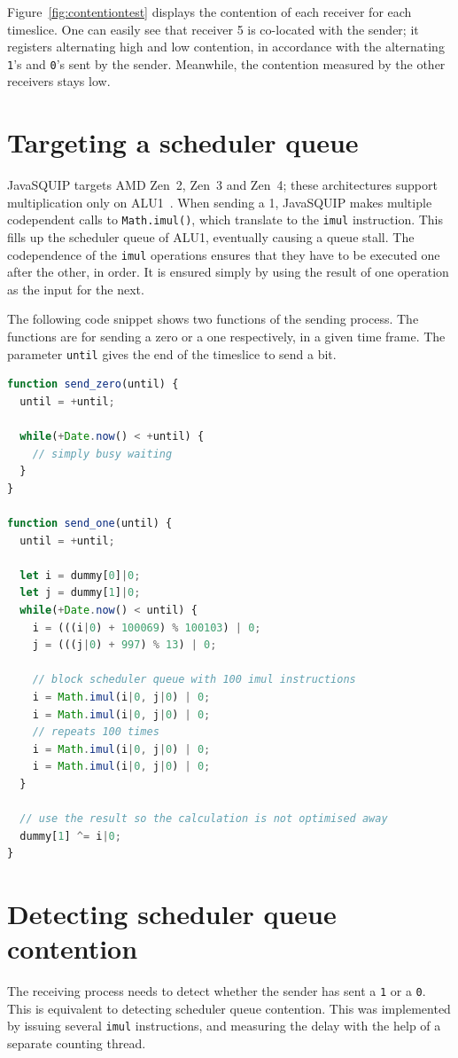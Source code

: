 \documentclass[11pt,
  titlepage=false,
]{scrreprt}
\begin{document}
Figure~\ref{fig:contentiontest} displays the contention of each receiver for each timeslice.
One can easily see that receiver 5 is co-located with the sender;
it registers alternating high and low contention, in accordance with the alternating \texttt{1}'s and \texttt{0}'s sent by the sender.
Meanwhile, the contention measured by the other receivers stays low.

\section{Targeting a scheduler queue}
JavaSQUIP targets AMD Zen~2, Zen~3 and Zen~4;
these architectures support multiplication only on ALU1~\cite{AMD2020OptimizationEPYC7003}.
When sending a 1, JavaSQUIP makes multiple codependent calls to \texttt{Math.imul()}, which translate to the \texttt{imul} instruction.
This fills up the scheduler queue of ALU1, eventually causing a queue stall.
The codependence of the \texttt{imul} operations ensures that they have to be executed one after the other, in order.
It is ensured simply by using the result of one operation as the input for the next.

The following code snippet shows two functions of the sending process.
The functions are for sending a zero or a one respectively, in a given time frame.
The parameter \texttt{until} gives the end of the timeslice to send a bit.
\begin{lstlisting}[language=JavaScript]
function send_zero(until) {
  until = +until;

  while(+Date.now() < +until) {
    // simply busy waiting
  }
}

function send_one(until) {
  until = +until;

  let i = dummy[0]|0;
  let j = dummy[1]|0;
  while(+Date.now() < until) {
    i = (((i|0) + 100069) % 100103) | 0;
    j = (((j|0) + 997) % 13) | 0;

    // block scheduler queue with 100 imul instructions
    i = Math.imul(i|0, j|0) | 0;
    i = Math.imul(i|0, j|0) | 0;
    // repeats 100 times
    i = Math.imul(i|0, j|0) | 0;
    i = Math.imul(i|0, j|0) | 0;
  }

  // use the result so the calculation is not optimised away
  dummy[1] ^= i|0;
}
\end{lstlisting}

\section{Detecting scheduler queue contention}
\label{sec:detect-sqc}
The receiving process needs to detect whether the sender has sent a \texttt{1} or a \texttt{0}.
This is equivalent to detecting scheduler queue contention.
This was implemented by issuing several \texttt{imul} instructions,
and measuring the delay with the help of a separate counting thread.
\end{document}
